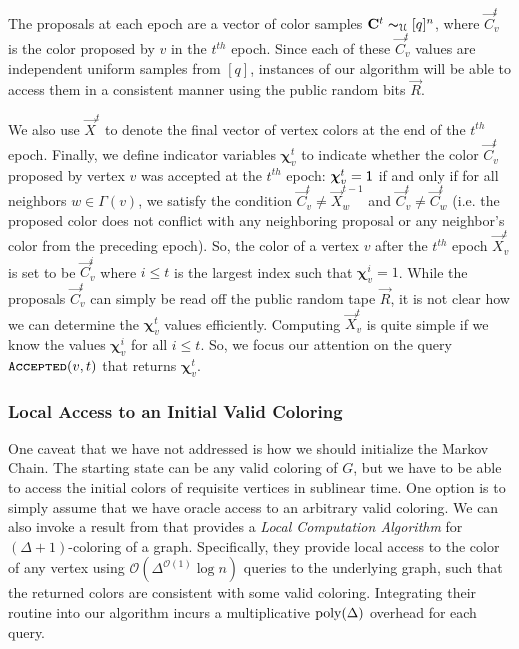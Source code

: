 The proposals at each epoch are a vector of color samples $\vec C^{t} \thicksim_{\mathcal U} [q]^n$,
where $\vec C^t_v$ is the color proposed by $v$ in the $t^{th}$ epoch.
Since each of these $\vec C^t_v$ values are independent uniform samples from $[q]$,
instances of our algorithm will be able to access them in a consistent manner using the public random bits $\vec R$.

We also use $\vec X^t$ to denote the final vector of vertex colors at the end of the $t^{th}$ epoch.
Finally, we define indicator variables $\bm \chi^t_v$ to indicate whether the color $\vec C^t_v$ proposed by vertex $v$
was accepted at the $t^{th}$ epoch: $\bm \chi^t_v = \ONE$ if and only if for all neighbors $w\in \Gamma(v)$,
we satisfy the condition $\vec C^t_v\not= \vec X^{t-1}_w$ and $\vec C^t_v\not= \vec C^t_w$
(i.e. the proposed color does not conflict with any neighboring proposal or any neighbor's color from the preceding epoch).
So, the color of a vertex $v$ after the $t^{th}$ epoch $\vec X^t_v$ is set to be $\vec C^i_v$
where $i\le t$ is the largest index such that $\bm \chi^i_v=1$.
While the proposals $\vec C^t_v$ can simply be read off the public random tape $\vec R$,
it is not clear how we can determine the $\bm \chi^t_v$ values efficiently.
Computing $\vec X^t_v$ is quite simple if we know the values $\bm\chi^i_v$ for all $i\le t$.
So, we focus our attention on the query $\func{Accepted}(v,t)$ that returns $\bm\chi^t_v$.


\subsubsection{Local Access to an Initial Valid Coloring}
\label{sec:local_access_to_an_initial_valid_coloring}
One caveat that we have not addressed is how we should initialize the Markov Chain.
The starting state can be any valid coloring of $G$, but we have to be able to access the initial colors of requisite vertices in sublinear time.
One option is to simply assume that we have oracle access to an arbitrary valid coloring.
We can also invoke a result from \cite{coloring_initialize} that provides a \emph{Local Computation Algorithm} for $(\Delta+1)$-coloring of a graph.
Specifically, they provide local access to the color of any vertex using $\mathcal O(\Delta^{\mathcal O(1)}\log n)$ queries to the underlying graph,
such that the returned colors are consistent with some valid coloring.
Integrating their routine into our algorithm incurs a multiplicative $\poly(\Delta)$ overhead for each query.

